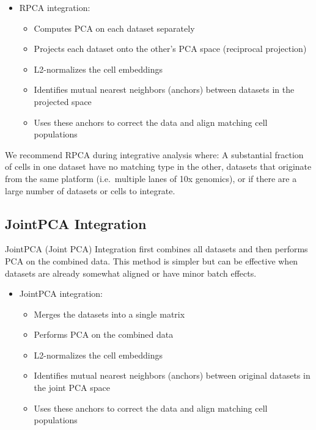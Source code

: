 \documentclass[
  letterpaper,
  DIV=11,
  numbers=noendperiod]{scrreprt}
\providecommand{\tightlist}{%
  \setlength{\itemsep}{0pt}\setlength{\parskip}{0pt}}
\begin{document}
\begin{itemize}
\item
  RPCA integration:

  \begin{itemize}
  \tightlist
  \item
    Computes PCA on each dataset separately
  \item
    Projects each dataset onto the other's PCA space (reciprocal
    projection)
  \item
    L2-normalizes the cell embeddings
  \item
    Identifies mutual nearest neighbors (anchors) between datasets in
    the projected space
  \item
    Uses these anchors to correct the data and align matching cell
    populations
  \end{itemize}
\end{itemize}

We recommend RPCA during integrative analysis where: A substantial
fraction of cells in one dataset have no matching type in the other,
datasets that originate from the same platform (i.e.~multiple lanes of
10x genomics), or if there are a large number of datasets or cells to
integrate.

\subsection{JointPCA Integration}\label{jointpca-integration}

JointPCA (Joint PCA) Integration first combines all datasets and then
performs PCA on the combined data. This method is simpler but can be
effective when datasets are already somewhat aligned or have minor batch
effects.

\begin{itemize}
\item
  JointPCA integration:

  \begin{itemize}
  \tightlist
  \item
    Merges the datasets into a single matrix
  \item
    Performs PCA on the combined data
  \item
    L2-normalizes the cell embeddings
  \item
    Identifies mutual nearest neighbors (anchors) between original
    datasets in the joint PCA space
  \item
    Uses these anchors to correct the data and align matching cell
    populations
  \end{itemize}
\end{itemize}
\end{document}
